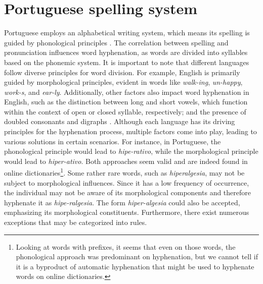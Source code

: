 \section{Portuguese spelling system}\label{sec-grammar-port}

Portuguese employs an alphabetical writing system, which means its spelling is
guided by phonological principles \parencite{cagliari2015}. The correlation between
spelling and pronunciation influences word hyphenation, as words are divided
into syllables based on the phonemic system. It is important to note that
different languages follow diverse principles for word division. For example,
English is primarily guided by morphological principles, evident in words like
\emph{walk-ing}, \emph{un-happy}, \emph{work-s}, and \emph{ear-ly}.
Additionally, other factors also impact word hyphenation in English, such as 
the distinction between long and short vowels, which function within the context
of open or closed syllable, respectively; and the presence of doubled consonants and
digraphs \parencite{lin2011,yavas2020}.
Although each language has its driving principles for the hyphenation process, 
multiple factors come into play, leading to various solutions in certain scenarios.
For instance, in Portuguese, the phonological principle would lead to \emph{hipe-rativo}, while 
the morphological principle would lead to \emph{hiper-ativo}. Both approaches seem valid
and are indeed found in online dictionaries\footnote{Looking at words with prefixes, 
it seems that even on those words, the phonological approach was predominant on hyphenation,
but we cannot tell if it is a byproduct of automatic hyphenation that might be used
to hyphenate words on online dictionaries.}.
Some rather rare words, such as \emph{hiperalgesia}, may not be subject to morphological 
influences. Since it has a low frequency of occurrence, the individual may not be
aware of its morphological components and therefore hyphenate it as \emph{hipe-ralgesia}.
The form \emph{hiper-algesia} could also be accepted, emphasizing its morphological constituents. 
Furthermore, there exist numerous exceptions that may be categorized into rules.


